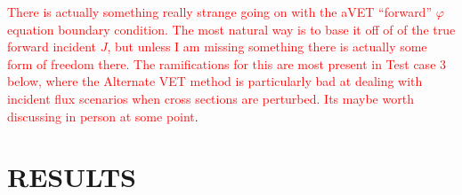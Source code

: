 \documentclass[12pt]{report}
\newcommand{\comment}[2]{\marginpar{\textcolor{#2}{$\star$}}\textcolor{#2}{#1}\newline}
\newcommand{\iwh}[1]{\comment{#1}{red}}
\newcommand{\iwh}[1]{\phantom{a}}
\begin{document}
\iwh{There is actually something really strange going on with the aVET ``forward''  $\varphi$ equation boundary condition. The most natural way is to base it off of of the true forward incident $J$, but unless I am missing something there is actually some form of freedom there. The ramifications for this are most present in Test case 3 below, where the Alternate VET method is particularly bad at dealing with incident flux scenarios when cross sections are perturbed. Its maybe worth discussing in person at some point}.

\chapter{\uppercase {Results}} \label{chap:results}

\end{document}

